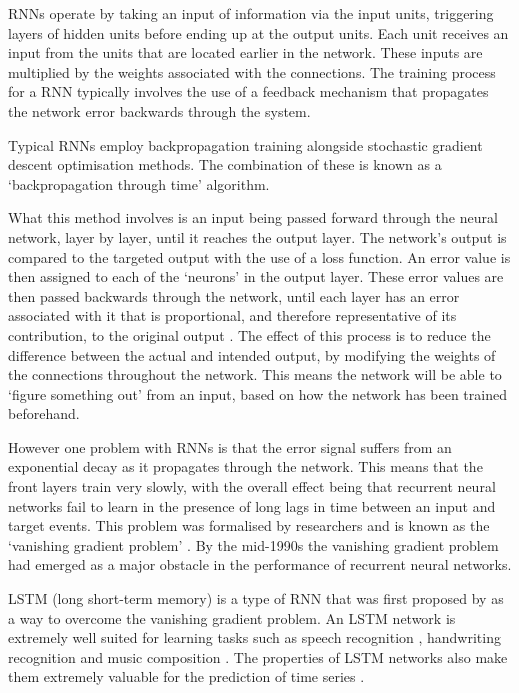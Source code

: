 RNNs operate by taking an input of information via the input units, triggering layers of hidden units before ending up at the output units. Each unit receives an input from the units that are located earlier in the network. These inputs are multiplied by the weights associated with the connections. The training process for a RNN typically involves the use of a feedback mechanism that propagates the network error backwards through the system.


Typical RNNs employ backpropagation training alongside stochastic gradient descent optimisation methods. The combination of these is known as a `backpropagation through time' algorithm. 

What this method involves is an input being passed forward through the neural network, layer by layer, until it reaches the output layer. The network's output is compared to the targeted output with the use of a loss function. An error value is then assigned to each of the `neurons' in the output layer. These error values are then passed backwards through the network, until each layer has an error associated with it that is proportional, and therefore representative of its contribution, to the original output \cite{Graves2012}. The effect of this process is to reduce the difference between the actual and intended output, by modifying the weights of the connections throughout the network. This means the network will be able to `figure something out' from an input, based on how the network has been trained beforehand.

However one problem with RNNs is that the error signal suffers from an exponential decay as it propagates through the network. This means that the front layers train very slowly, with the overall effect being that recurrent neural networks fail to learn in the presence of long lags in time between an input and target events. This problem was formalised by researchers and is known as the `vanishing gradient problem' \cite{hochreiter1991untersuchungen, hochreiter2001gradient}. By the mid-1990s the vanishing gradient problem had emerged as a major obstacle in the performance of recurrent neural networks.

LSTM (long short-term memory) is a type of RNN that was first proposed by \cite{Hochreiter:1997:LSM:1246443.1246450} as a way to overcome the vanishing gradient problem. An LSTM network is extremely well suited for learning tasks such as speech recognition \cite{Graves2005602}, handwriting recognition \cite{graves2008unconstrained} and music composition \cite{eck2002learning}. The properties of LSTM networks also make them extremely valuable for the prediction of time series \cite{gers2001applying}.


